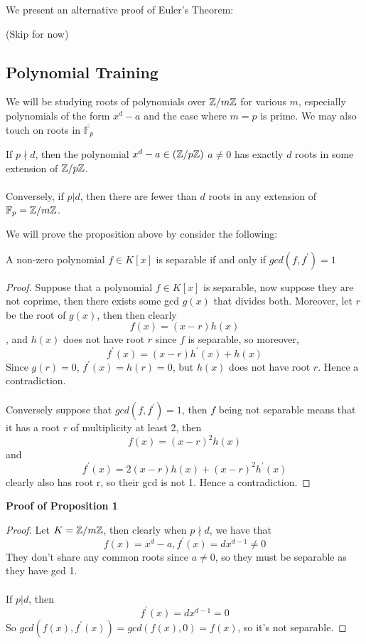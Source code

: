 We present an alternative proof of Euler's Theorem:

(Skip for now)

\subsection{Polynomial Training}
We will be studying roots of polynomials over $\mathbb{Z}/m\mathbb{Z}$ for various $m$, especially polynomials of the form $x^d - a$ and the case where $m = p$ is prime. We may also touch on roots in $\overline{\mathbb{F}_p}$

\begin{proposition}
If $p \nmid d$, then the polynomial $x^d - a \in (\mathbb{Z}/p\mathbb{Z})$ $a \neq 0$ has exactly $d$ roots in some extension of $\mathbb{Z}/p\mathbb{Z}$.\\\\
Conversely, if $p | d$, then there are fewer than $d$ roots in any extension of $\mathbb{F}_p = \mathbb{Z}/m\mathbb{Z}$.
\end{proposition}

We will prove the proposition above by consider the following:

\begin{proposition}
A non-zero polynomial $f \in K[x]$ is separable if and only if $gcd(f, f^\prime) = 1$
\end{proposition}

\begin{proof}
Suppose that a polynomial $f \in K[x]$ is separable, now suppose they are not coprime, then there exists some gcd $g(x)$ that divides both. Moreover, let $r$ be the root of $g(x)$, then
then clearly
\[f(x) = (x - r)h(x)\]
, and $h(x)$ does not have root $r$ since $f$ is separable, so moreover,
\[f^{\prime}(x) = (x - r)h^{\prime}(x) + h(x)\]
Since $g(r) = 0$, $f^{\prime}(x) = h(r) = 0$, but $h(x)$ does not have root $r$. Hence a contradiction.\\\\
Conversely suppose that $gcd(f, f^\prime) = 1$, then $f$ being not separable means that it has a root $r$ of multiplicity at least 2, then
\[f(x) = (x - r)^2h(x)\]
and
\[f^\prime(x) = 2(x-r)h(x) + (x-r)^2h^\prime(x)\]
clearly also has root r, so their gcd is not 1. Hence a contradiction.
\end{proof}

{\bf Proof of Proposition 1}
\begin{proof}
Let $K = \mathbb{Z}/m\mathbb{Z}$, then clearly when $p \nmid d$, we have that
\[f(x) = x^d - a, f^\prime(x) = dx^{d-1} \neq 0\]
They don't share any common roots since $a \neq 0$, so they must be separable as they have gcd 1.\\\\
If $p | d$, then 
\[f^{\prime}(x) = dx^{d-1}  = 0\]
So $gcd(f(x), f^\prime(x)) = gcd(f(x), 0) = f(x)$, so it's not separable.
\end{proof}

